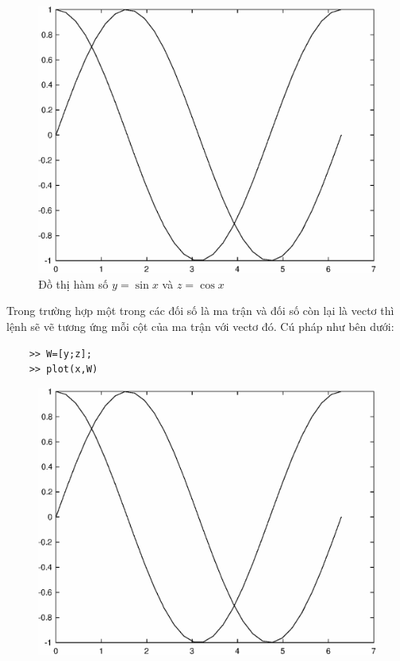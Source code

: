 \documentclass[12pt,a4paper]{article}
\begin{document}
\begin{example}
\begin{center}
	\begin{figure}[htp]
	\begin{center}
		\includegraphics[scale=0.6]{hinhtieuluan/dothi2}
	\end{center}
		\caption{Đồ thị hàm số $y=\sin{x}$ và $z=\cos{x}$}
		\label{refdothi2}
	\end{figure}
\end{center}
Trong trường hợp một trong các đối số là ma trận và đối số còn lại là vectơ thì lệnh  sẽ vẽ tương ứng mỗi cột của ma trận với vectơ đó. Cú pháp như bên dưới:
\begin{lstlisting}
	>> W=[y;z];
	>> plot(x,W)
\end{lstlisting}
\begin{center}
	\begin{figure}[htp]
	\begin{center}
		\includegraphics[scale=0.6]{hinhtieuluan/dothi3}

\end{center}
\end{figure}
\end{center}
\end{example}
\end{document}
